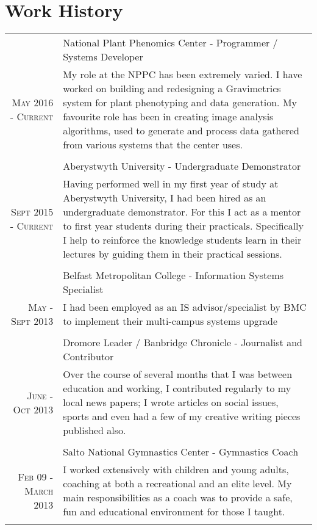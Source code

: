 \documentclass[a4paper,10pt]{article}
\begin{document}
\section{Work History}
\begin{longtable}{r|p{11cm}}
  
  &National Plant Phenomics Center - Programmer / Systems Developer \\\textsc{May 2016 - Current}
  &\footnotesize{
    My role at the NPPC has been extremely varied. I have worked on building and redesigning a Gravimetrics system for plant phenotyping and
    data generation. 
    My favourite role has been in creating image analysis algorithms, used to generate and process data gathered from various systems that
    the center uses.
                                                                                                   }\\\multicolumn{2}{c}{} \\
  
  
  &Aberystwyth University - Undergraduate Demonstrator \\\textsc{Sept 2015 - Current}
  &\footnotesize{Having performed well in my first year of study at Aberystwyth University, I had been hired as an undergraduate demonstrator. For this I act as a mentor to first year students during their practicals. Specifically I help to reinforce the knowledge students learn in their lectures by guiding them in their practical sessions.}\\\multicolumn{2}{c}{} \\

  &Belfast Metropolitan College - Information Systems Specialist \\\textsc{May - Sept 2013}
  &\footnotesize{I had been employed as an IS advisor/specialist by BMC to implement their multi-campus systems upgrade}\\\multicolumn{2}{c}{} \\
  &Dromore Leader / Banbridge Chronicle - Journalist and Contributor \\\textsc{June - Oct 2013}
  &\footnotesize{Over the course of several months that I was between education and working, I contributed regularly to my local news papers; I wrote articles on social issues, sports and even had a few of my creative writing pieces published also.}\\\multicolumn{2}{c}{} \\

  &Salto National Gymnastics Center - Gymnastics Coach \\\textsc{Feb 09 - March 2013}
  &\footnotesize{I worked extensively with children and young adults, coaching at both a recreational and an elite level. My main responsibilities as a coach was to provide a safe, fun and educational environment for those I taught.}\\\multicolumn{2}{c}{} \\
\end{longtable}
\end{document}
